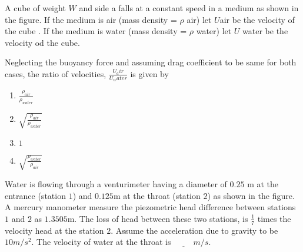\item A cube of weight $W$ and side a falls at a constant speed in a medium as shown in the figure. If the medium is air (mass density = $\rho$ air) let $U$air be the velocity of the cube . If the medium is water (mass density = $\rho$ water) let $U$ water be the velocity od the cube. 
\begin{figure}[!ht]
\centering
{}%

\label{fig:my_label}
\end{figure}
Neglecting the buoyancy force and assuming drag coefficient to be same for both cases, the ratio of velocities, $\frac{U_air}{U_water}$ is given by 
\begin{enumerate}
    \item $\frac{\rho_{air}}{\rho_{water}}$
    \item $\sqrt{\frac{\rho_{air}}{\rho_{water}}}$
    \item $1$
    \item $\sqrt{\frac{\rho_{water}}{\rho_{air}}}$\\
\end{enumerate}
\item Water is flowing through a venturimeter having a diameter of $0.25$ m at the entrance (station $1$) and $0.125$m at the throat (station $2$) as shown in the figure. A mercury manometer measure the piezometric head difference between stations $1$ and $2$ as $1.3505$m. The loss of head between these two stations, is $\frac{1}{7}$ times the velocity head at the station $2$. Assume the acceleration due to gravity to be $10 m/s^2$. The velocity of water at the throat is $\underline{\hspace{1cm}} m/s.$\\

